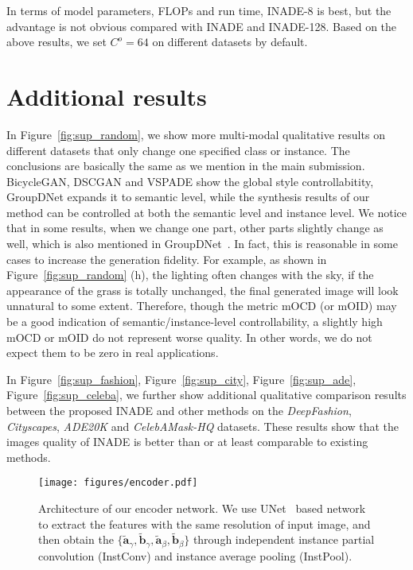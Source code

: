 \documentclass[final]{cvpr}
\begin{document}
In terms of model parameters, FLOPs and run time, INADE-8 is best, but the advantage is not obvious compared with INADE and INADE-128. Based on the above results, we set $C^o=64$ on different datasets by default. 

\section{Additional results}
In Figure~\ref{fig:sup_random}, we show more multi-modal qualitative results on different datasets that only change one specified class or instance. The conclusions are basically the same as we mention in the main submission. BicycleGAN, DSCGAN and VSPADE show the global style controllabitity, GroupDNet expands it to semantic level, while the synthesis results of our method can be controlled at both the semantic level and instance level. We notice that in some results, when we change one part, other parts slightly change as well, which is also mentioned in GroupDNet~\cite{zhu2020semantically}. In fact, this is reasonable in some cases to 
increase the generation fidelity. For example, as shown in Figure~\ref{fig:sup_random} (h), the lighting often changes with the sky, if the appearance of the grass is totally unchanged, the final generated image will look unnatural to some extent. Therefore, though the metric mOCD (or mOID) may be a good indication of semantic/instance-level controllability, a slightly high mOCD or mOID do not represent worse quality. In other words, we do not expect them to be zero in real applications. 

In Figure~\ref{fig:sup_fashion}, Figure~\ref{fig:sup_city}, Figure~\ref{fig:sup_ade}, Figure~\ref{fig:sup_celeba}, we further show additional qualitative comparison results between the proposed INADE and other methods on the \textit{DeepFashion}, \textit{Cityscapes}, \textit{ADE20K} and \textit{CelebAMask-HQ} datasets. These results show that the images quality of INADE is better than or at least comparable to existing methods.

\begin{figure}[tp]
  \centering
  \texttt{[image: figures/encoder.pdf]}
  \caption{Architecture of our encoder network. We use UNet~\cite{ronneberger2015u} based network to extract the features with the same resolution of input image, and then obtain the $\{\tilde{\bm{a}}_\gamma,\tilde{\bm{b}}_\gamma,\tilde{\bm{a}}_\beta,\tilde{\bm{b}}_\beta\}$ through independent instance partial convolution (InstConv) and instance average pooling (InstPool).}
  \label{fig:encoder}
\end{figure}
\end{document}
